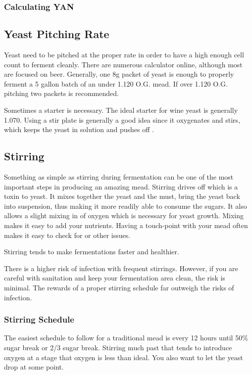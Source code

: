 \documentclass{article}
\begin{document}
  \subsubsection{Calculating YAN}

 \subsection{Yeast Pitching Rate}
  Yeast need to be pitched at the proper rate in order to have a high enough cell count to ferment cleanly. There are numerous calculator online, although most
  are focused on beer. Generally, one 8g packet of yeast is enough to properly ferment a 5 gallon batch of an under 1.120 O.G. mead. If over 1.120 O.G. pitching
  two packets is recommended. 

  Sometimes a starter is necessary. The ideal starter for wine yeast is generally 1.070. Using a stir plate is generally a good idea since it oxygenates and stirs,
  which keeps the yeast in solution and pushes off .

 \subsection{Stirring}
  Something as simple as stirring during fermentation can be one of the most important steps in producing an amazing mead. Stirring drives off  which is a 
  toxin to yeast. It mixes together the yeast and the must, bring the yeast back into suspension, thus making it more readily able to consume the sugars. It also
  allows a slight mixing in of oxygen which is necessary for yeast growth. Mixing makes it easy to add your nutrients. Having a touch-point with your mead often
  makes it easy to check for  or other issues.

  Stirring tends to make fermentations faster and healthier. 

  There is a higher risk of infection with frequent stirrings. However, if you are careful with sanitation and keep your fermentation area clean, the risk is minimal.
  The rewards of a proper stirring schedule far outweigh the risks of infection.

  \subsubsection{Stirring Schedule}
   The easiest schedule to follow for a traditional mead is every 12 hours until 50\% sugar break or 2/3 sugar break. Stirring much past that tends to introduce
   oxygen at a stage that oxygen is less than ideal. You also want to let the yeast drop at some point.
\end{document}
